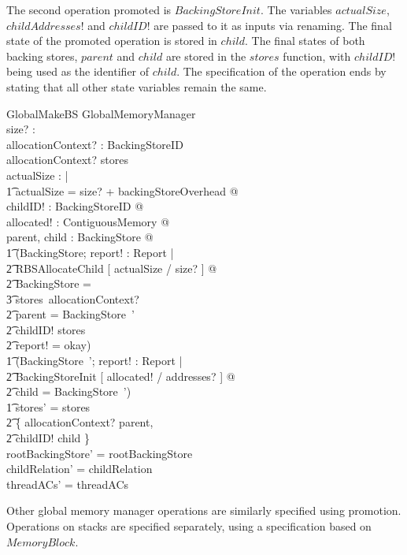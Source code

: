 \documentclass[a4paper,10pt]{article}
\begin{document}
The second operation promoted is $BackingStoreInit$. The variables
$actualSize$, $childAddresses!$ and $childID!$ are passed to it as inputs via
renaming. The final state of the promoted operation is stored in $child$.  The final 
states of both backing stores, $parent$ and $child$ are stored in the $stores$
function, with $childID!$ being used as the identifier of $child$. The 
specification of the operation ends by stating that all other state variables
remain the same.
%
\begin{schema}{GlobalMakeBS}
  \Delta GlobalMemoryManager \\
  size? : \nat \\
  allocationContext? : BackingStoreID \\
\where
  allocationContext? \in \dom stores \\
  \exists actualSize : \nat | \\
  \t1 actualSize = size? + backingStoreOverhead @ \\
  \exists childID! : BackingStoreID @ \\
  \exists allocated! : ContiguousMemory @ \\
  \exists parent, child : BackingStore @ \\
  \t1 (\exists \Delta BackingStore; report! : Report | \\
    \t2 RBSAllocateChild [ actualSize / size? ] @ \\
    \t2 \theta BackingStore = \\
      \t3 stores~allocationContext? \land \\
    \t2 parent = \theta BackingStore~' \land \\
    \t2 childID! \notin \dom stores \land \\
    \t2 report! = okay) \land \\
  \t1 (\exists BackingStore~'; report! : Report | \\
    \t2 BackingStoreInit [ allocated! / addresses? ] @ \\
    \t2 child = \theta BackingStore~') \land \\
  \t1 stores' = stores \oplus \\
    \t2 \{ allocationContext? \mapsto parent, \\
    \t2 childID! \mapsto child \} \\
  rootBackingStore' = rootBackingStore \\
  childRelation' = childRelation \\
  threadACs' = threadACs \\
\end{schema}
%
Other global memory manager operations are similarly specified using
promotion. Operations on stacks are specified separately, using a
specification based on $MemoryBlock$.

\raggedright
\printbibliography
\end{document}
